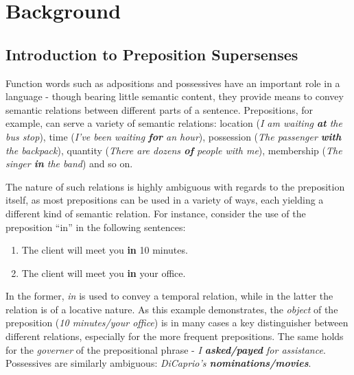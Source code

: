 
\chapter{Background} %

\label{Background} %


\section{Introduction to Preposition Supersenses} \label{sec:pss}
Function words such as adpositions and possessives have an important role in a language - though bearing little semantic content, they provide means to convey semantic relations between different parts of a sentence. Prepositions, for example, can serve a variety of semantic relations: location (\textit{I am waiting \textbf{at} the bus stop}), time (\textit{I've been waiting \textbf{for} an hour}), possession (\textit{The passenger \textbf{with} the backpack}), quantity (\textit{There are dozens \textbf{of} people with me}), membership (\textit{The singer \textbf{in} the band}) and so on.

The nature of such relations is highly ambiguous with regards to the preposition itself, as most prepositions can be used in a variety of ways, each yielding a different kind of semantic relation. For instance, consider the use of the preposition “in” in the following sentences: 

\begin{enumerate}
    \item The client will meet you \textbf{in} 10 minutes.
    \item The client will meet you \textbf{in} your office.
\end{enumerate}

In the former, \emph{in} is used to convey a temporal relation, while in the latter the relation is of a locative nature.  As this example demonstrates, the \emph{object} of the preposition (\emph{10 minutes/your office}) is in many cases a key distinguisher between different relations, especially for the more frequent prepositions. The same  holds for the \emph{governer} of the prepositional phrase - \textit{I \textbf{asked/payed} for assistance}. Possessives are similarly ambiguous: \emph{DiCaprio’s \textbf{nominations/movies}}. 

